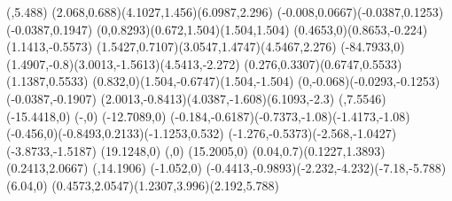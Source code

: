 {	\moveto(,5.488)
	\rcurveto(2.068,0.688)(4.1027,1.456)(6.0987,2.296)
	\rcurveto(-0.008,0.0667)(-0.0387,0.1253)(-0.0387,0.1947)
	\rcurveto(0,0.8293)(0.672,1.504)(1.504,1.504)
	\rcurveto(0.4653,0)(0.8653,-0.224)(1.1413,-0.5573)
	\rcurveto(1.5427,0.7107)(3.0547,1.4747)(4.5467,2.276)
	\rlineto(-84.7933,0)
	\rcurveto(1.4907,-0.8)(3.0013,-1.5613)(4.5413,-2.272)
	\rcurveto(0.276,0.3307)(0.6747,0.5533)(1.1387,0.5533)
	\rcurveto(0.832,0)(1.504,-0.6747)(1.504,-1.504)
	\rcurveto(0,-0.068)(-0.0293,-0.1253)(-0.0387,-0.1907)
	\rcurveto(2.0013,-0.8413)(4.0387,-1.608)(6.1093,-2.3)
	\closepath
	\moveto(,7.5546)
	\rlineto(-15.4418,0)
	\rlineto(-,0)
	\rlineto(-12.7089,0)
	\rcurveto(-0.184,-0.6187)(-0.7373,-1.08)(-1.4173,-1.08)
	\rcurveto(-0.456,0)(-0.8493,0.2133)(-1.1253,0.532)
	\rcurveto(-1.276,-0.5373)(-2.568,-1.0427)(-3.8733,-1.5187)
	\rlineto(19.1248,0)
	\rlineto(,0)
	\rlineto(15.2005,0)
	\rcurveto(0.04,0.7)(0.1227,1.3893)(0.2413,2.0667)
	\moveto(,14.1906)
	\rlineto(-1.052,0)
	\rcurveto(-0.4413,-0.9893)(-2.232,-4.232)(-7.18,-5.788)
	\rlineto(6.04,0)
	\rcurveto(0.4573,2.0547)(1.2307,3.996)(2.192,5.788)
	\closepath
}
\newcommand{\pixieDrawOutlinedSectionSpell}[2]{
	\moveto(0,20.7118)
	\rlineto(6.368,-6.368)
	\rlineto(\fpeval{max(#1-\pixieOutlinedSectionSpellMinWidth,0)},0)
	\rlineto(149.4307,0)
	\rlineto(6.368,6.368)
	\rlineto(0,4.2882)
	\rlineto(0,\fpeval{max(#2-\pixieOutlinedSectionSpellMinHeight,0)})
	\rlineto(0,27.4411)
	\rlineto(-6.368,6.368)
	\rlineto(-\fpeval{max(#1-\pixieOutlinedSectionSpellMinWidth,0)},0)
	\rlineto(-149.4307,-0)
	\rlineto(-6.368,-6.368)
	\closepath
}
\newcommand{\pixieDrawOutlinedSectionSpellDividerHalfBg}{
	\moveto(-2,0.875)
    \rlineto(2,0)
	\rcurveto(5,0)(5,7.5)(0,7.5)
    \rlineto(-2,0)
	\closepath
}
\newcommand{\pixieDrawOutlinedSectionSpellDividerHalf}{
	\moveto(0,0)
	\rlineto(0,0.875)
	\rcurveto(5,0)(5,7.5)(0,7.5)
	\rlineto(0,0.875)
	\rcurveto(3.5,0)(4.5,-3.5)(11.25,-3.75)
	\rcurveto(0.375,0)(1,-0.25)(1.1875,-0.625)
	\rlineto(-7.5,0)
	\rcurveto(-0.375,0)(-0.375,-0.5)(0,-0.5)
	\rlineto(7.5,0)
	\rcurveto(-0.1875,-0.375)(-0.8125,-0.625)(-1.1875,-0.625)
	\rcurveto(-6.75,0)(-7.75,-3.75)(-11.25,-3.75)
}
\newcommand{\pixieOutlinedSectionSpellDividers}[4]{
    \pscustom[linestyle=none,fillstyle=solid,fillcolor=white,opacity=1]{
        \translate(#1,#2)
        \translate(0,#4)
        \pixieDrawOutlinedSectionSpellDividerHalfBg
        \translate(#3,0)
        \scale{-1 1}
        \pixieDrawOutlinedSectionSpellDividerHalfBg
    }
    \pscustom[linestyle=none,fillstyle=solid,fillcolor=black,opacity=1]{
        \translate(#1,#2)
        \translate(0,#4)
        \pixieDrawOutlinedSectionSpellDividerHalf
        \translate(\fpeval{#3},0)
        \scale{-1 1}
        \pixieDrawOutlinedSectionSpellDividerHalf
    }
}

